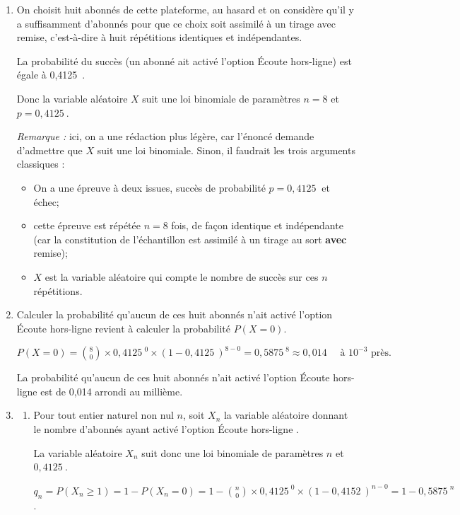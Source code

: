\documentclass[10pt]{article}
\providecommand{\np}[2][]{{#2~#1}}
\begin{document}
\begin{enumerate}
\item On choisit huit abonnés de cette plateforme, au hasard et on considère qu'il y a suffisamment d'abonnés pour que ce choix soit assimilé à un tirage avec remise, c'est-à-dire à huit répétitions identiques et indépendantes.

La probabilité du succès (un abonné ait activé l'option \og Écoute hors-ligne\fg{}) est égale à \np{0,4125}.

Donc la variable aléatoire $X$ suit une loi binomiale de paramètres $n=8$ et $p= \np{0,4125}$.

\emph{Remarque :} ici, on a une rédaction plus légère, car l'énoncé demande d'admettre que $X$ suit une loi binomiale. Sinon, il faudrait les trois arguments classiques :

\begin{itemize}
\item On a une épreuve à deux issues, succès de probabilité $p = \np{0,4125}$ et échec;
\item cette épreuve est répétée $n = 8$ fois, de façon identique et indépendante (car la constitution de l'échantillon est assimilé à un tirage au sort \textbf{avec} remise);
\item $X$ est la variable aléatoire qui compte le nombre de succès sur ces $n$ répétitions.
\end{itemize}

\item Calculer la probabilité qu'aucun de ces huit abonnés n'ait activé l'option \og Écoute hors-ligne \fg{} revient à calculer la probabilité $P(X =0)$.

$\displaystyle P(X = 0)= \binom{8}{0} \times \np{0,4125}^0 \times (1 - \np{0,4125})^{8-0} = \np{0,5875}^8 \approx 0,014 \quad\text{ à } 10^{-3} \text{ près.}$

La probabilité qu'aucun de ces huit abonnés n'ait activé l'option \og Écoute hors-ligne \fg{} est de 0,014 arrondi au millième.

\item
	\begin{enumerate}
		\item Pour tout entier naturel non nul $n$, soit $X_n$ la variable aléatoire donnant le nombre d'abonnés ayant activé l'option \og Écoute hors-ligne \fg{}.

La variable aléatoire $X_n$ suit donc une loi binomiale de paramètres $n$ et $\np{0,4125}$.

$\displaystyle q_n = P(X_n \geqslant 1) = 1 - P (X_n=0) =1- \binom{n}{0} \times \np{0,4125}^0 \times (1- \np{0,4152})^{n-0}= 1- \np{0,5875}^n$.


\end{enumerate}
\end{enumerate}
\end{document}
